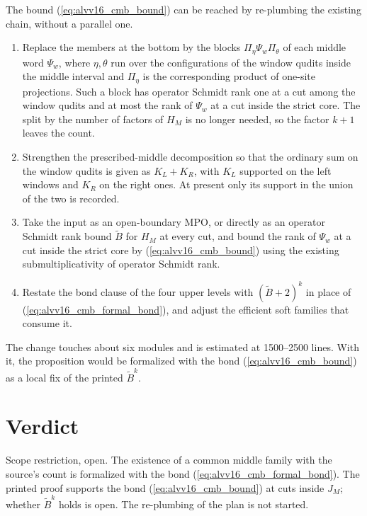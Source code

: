 \documentclass{article}
\begin{document}
The bound (\ref{eq:alvv16_cmb_bound}) can be reached by re-plumbing the
existing chain, without a parallel one.
\begin{enumerate}
 \item Replace the members at the bottom by the blocks
  $\Pi_\eta\Psi_w\Pi_\theta$ of each middle word $\Psi_w$, where $\eta,\theta$
  run over the configurations of the window qudits inside the middle interval
  and $\Pi_\eta$ is the corresponding product of one-site projections. Such a
  block has operator Schmidt rank one at a cut among the window qudits and at
  most the rank of $\Psi_w$ at a cut inside the strict core. The split by the
  number of factors of $H_M$ is no longer needed, so the factor $k+1$ leaves
  the count.
 \item Strengthen the prescribed-middle decomposition so that the ordinary
  sum on the window qudits is given as $K_L+K_R$, with $K_L$ supported on the
  left windows and $K_R$ on the right ones. At present only its support in
  the union of the two is recorded.
 \item Take the input as an open-boundary MPO, or directly as an operator
  Schmidt rank bound $\tilde B$ for $H_M$ at every cut, and bound the rank of
  $\Psi_w$ at a cut inside the strict core by (\ref{eq:alvv16_cmb_bound}) using
  the existing submultiplicativity of operator Schmidt rank.
 \item Restate the bond clause of the four upper levels with
  $(\tilde B+2)^k$ in place of (\ref{eq:alvv16_cmb_formal_bond}), and adjust
  the efficient soft families that consume it.
\end{enumerate}
The change touches about six modules and is estimated at 1500--2500 lines.
With it, the proposition would be formalized with the bond
(\ref{eq:alvv16_cmb_bound}) as a local fix of the printed $\tilde B^k$.

\section{Verdict}

Scope restriction, open. The existence of a common middle family with the
source's count is formalized with the bond (\ref{eq:alvv16_cmb_formal_bond}).
The printed proof supports the bond (\ref{eq:alvv16_cmb_bound}) at cuts inside
$J_M$; whether $\tilde B^k$ holds is open. The re-plumbing of the plan is not
started.



\end{document}
